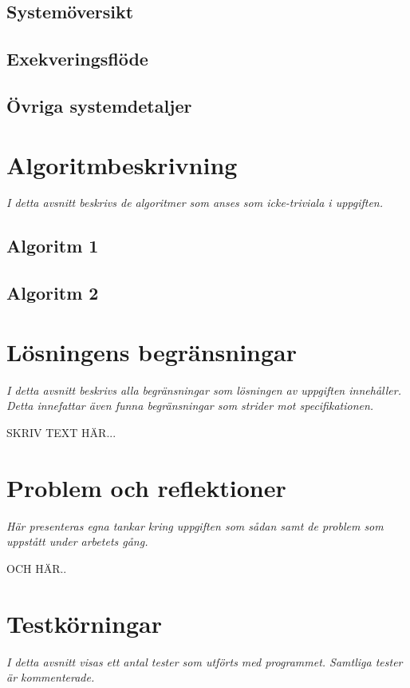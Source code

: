 \documentclass[12pt, a4paper]{article}
\begin{document}
		\subsection{Systemöversikt}

		\subsection{Exekveringsflöde}
			
		\subsection{Övriga systemdetaljer}

	\section{Algoritmbeskrivning}
		\emph{I detta avsnitt beskrivs de algoritmer som anses som
			icke-triviala i uppgiften.}
		
		\subsection{Algoritm 1}
			
		\subsection{Algoritm 2}	
	
	\section{Lösningens begränsningar}
		\emph{I detta avsnitt beskrivs alla begränsningar som lösningen av
			uppgiften innehåller. Detta innefattar även funna begränsningar
			som strider mot specifikationen.}
		
		SKRIV TEXT HÄR...

	\section{Problem och reflektioner}
		\emph{Här presenteras egna tankar kring uppgiften som sådan samt de
			problem som uppstått under arbetets gång.}
		
		OCH HÄR..

	\section{Testkörningar}
		\emph{I detta avsnitt visas ett antal tester som utförts med programmet.
			Samtliga tester är kommenterade.}
		
\end{document}
